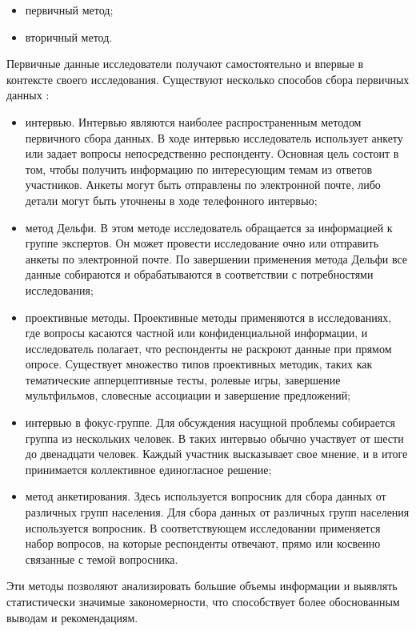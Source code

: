 \begin{itemize}
	\item первичный метод;
	\item вторичный метод.
\end{itemize}

Первичные данные исследователи получают самостоятельно и впервые в контексте своего исследования.
Существуют несколько способов сбора первичных данных :

\begin{itemize}
	\item интервью. Интервью являются наиболее распространенным методом первичного сбора данных. В ходе интервью исследователь использует анкету или задает вопросы непосредственно респонденту. Основная цель состоит в том, чтобы получить информацию по интересующим темам из ответов участников. Анкеты могут быть отправлены по электронной почте, либо детали могут быть уточнены в ходе телефонного интервью;
	\item метод Дельфи. В этом методе исследователь обращается за информацией к группе экспертов. Он может провести исследование очно или отправить анкеты по электронной почте. По завершении применения метода Дельфи все данные собираются и обрабатываются в соответствии с потребностями исследования;
	\item проективные методы. Проективные методы применяются в исследованиях, где вопросы касаются частной или конфиденциальной информации, и исследователь полагает, что респонденты не раскроют данные при прямом опросе. Существует множество типов проективных методик, таких как тематические апперцептивные тесты, ролевые игры, завершение мультфильмов, словесные ассоциации и завершение предложений;
	\item интервью в фокус-группе. Для обсуждения насущной проблемы собирается группа из нескольких человек. В таких интервью обычно участвует от шести до двенадцати человек. Каждый участник высказывает свое мнение, и в итоге принимается коллективное единогласное решение;
	\item метод анкетирования. Здесь используется вопросник для сбора данных от различных 
	групп населения. Для сбора данных от различных групп населения используется вопросник. В соответствующем исследовании применяется набор вопросов, на которые респонденты отвечают, прямо или косвенно связанные с темой вопросника.
\end{itemize}

Эти методы позволяют анализировать большие объемы информации и выявлять статистически значимые закономерности, что способствует более обоснованным выводам и рекомендациям.


